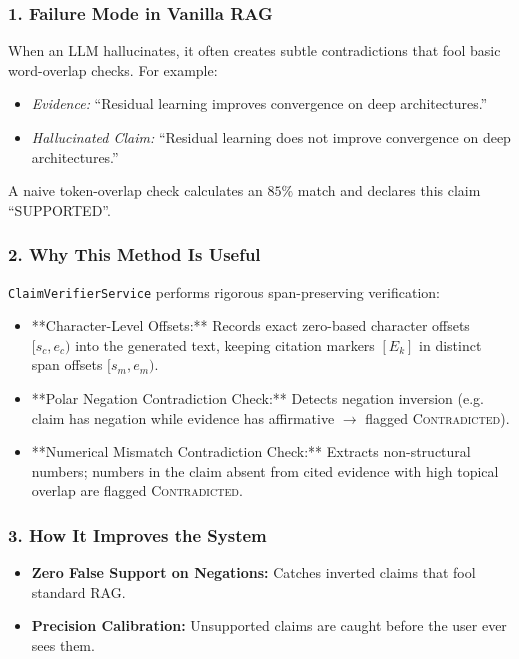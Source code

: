 \documentclass[11pt,a4paper]{article}
\begin{document}
\subsubsection{1. Failure Mode in Vanilla RAG}
When an LLM hallucinates, it often creates subtle contradictions that fool basic word-overlap checks. For example:
\begin{itemize}[leftmargin=*]
    \item \emph{Evidence:} ``Residual learning improves convergence on deep architectures.''
    \item \emph{Hallucinated Claim:} ``Residual learning does not improve convergence on deep architectures.''
\end{itemize}
A naive token-overlap check calculates an $85\%$ match and declares this claim ``SUPPORTED''.

\subsubsection{2. Why This Method Is Useful}
\texttt{ClaimVerifierService} performs rigorous span-preserving verification:
\begin{itemize}[leftmargin=*]
    \item **Character-Level Offsets:** Records exact zero-based character offsets $[s_c, e_c)$ into the generated text, keeping citation markers $[E_k]$ in distinct span offsets $[s_m, e_m)$.
    \item **Polar Negation Contradiction Check:** Detects negation inversion (e.g. claim has negation while evidence has affirmative $\rightarrow$ flagged \textsc{Contradicted}).
    \item **Numerical Mismatch Contradiction Check:** Extracts non-structural numbers; numbers in the claim absent from cited evidence with high topical overlap are flagged \textsc{Contradicted}.
\end{itemize}

\subsubsection{3. How It Improves the System}
\begin{itemize}[leftmargin=*]
    \item \textbf{Zero False Support on Negations:} Catches inverted claims that fool standard RAG.
    \item \textbf{Precision Calibration:} Unsupported claims are caught before the user ever sees them.
\end{itemize}
\end{document}
